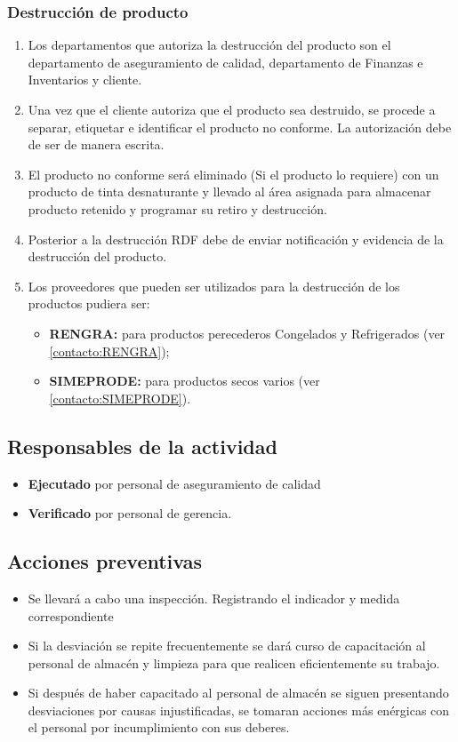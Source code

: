 \subsubsection{Destrucción de producto}
\label{sec:destprod}
\begin{enumerate}
	\item Los departamentos que autoriza la destrucción del producto son el departamento de aseguramiento de calidad, departamento de Finanzas e Inventarios y cliente.
	\item Una vez que el cliente autoriza que el producto sea destruido, se procede a separar, etiquetar e identificar el producto no conforme. La autorización debe de ser de manera escrita.
	\item El producto no conforme será eliminado (Si el producto lo requiere) con un producto de tinta desnaturante y llevado al área asignada para almacenar producto retenido y programar su retiro y destrucción.
	\item Posterior a la destrucción RDF debe de enviar notificación y evidencia de la destrucción del producto.
	\item Los proveedores que pueden ser utilizados para la destrucción de los productos pudiera ser:
	\begin{itemize}
		\item \textbf{RENGRA:} para productos perecederos Congelados y Refrigerados (ver \cref{contacto:RENGRA});
		\item \textbf{SIMEPRODE:} para productos secos varios (ver \cref{contacto:SIMEPRODE}).
	\end{itemize}
\end{enumerate}


\subsection{Responsables de la actividad}
\begin{itemize}
	\item \textbf{Ejecutado} por personal de aseguramiento de calidad
	\item \textbf{Verificado} por personal de gerencia.
\end{itemize}

\subsection{Acciones preventivas}
\begin{itemize}
	\item Se llevará a cabo una inspección. Registrando el indicador y medida correspondiente
	\item Si la desviación se repite frecuentemente se dará curso de capacitación al personal de almacén y limpieza para que realicen eficientemente su trabajo.
	\item Si después de haber capacitado al personal de almacén se siguen presentando desviaciones por causas injustificadas, se tomaran acciones más enérgicas con el personal por incumplimiento con sus deberes.
\end{itemize}

